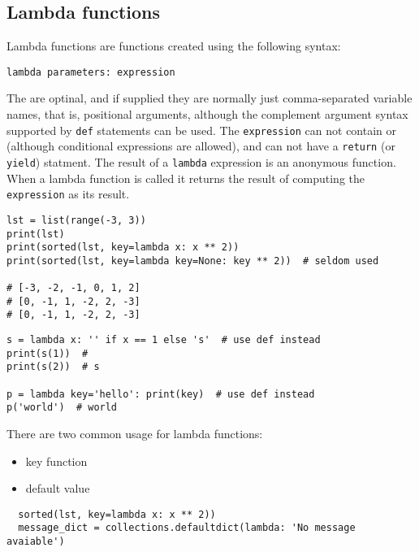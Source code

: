 \subsection{Lambda functions}

Lambda functions are functions created using the following syntax:
\begin{tcolorbox}
\begin{verbatim}
lambda parameters: expression
\end{verbatim}
\end{tcolorbox}


The  are optinal, and if supplied they are normally just comma-separated variable names, that is, positional arguments, although the complement argument syntax supported by \verb|def| statements can be used.
The \verb|expression| can not contain  or  (although conditional expressions are allowed), and can not have a \verb|return| (or \verb|yield|) statment.
The result of a \verb|lambda| expression is an anonymous function.
When a lambda function is called it returns the result of computing the \verb|expression| as its result.



\begin{lstlisting}
lst = list(range(-3, 3))
print(lst)
print(sorted(lst, key=lambda x: x ** 2))
print(sorted(lst, key=lambda key=None: key ** 2))  # seldom used

# [-3, -2, -1, 0, 1, 2]
# [0, -1, 1, -2, 2, -3]
# [0, -1, 1, -2, 2, -3]
\end{lstlisting}


\begin{lstlisting}
s = lambda x: '' if x == 1 else 's'  # use def instead
print(s(1))  #
print(s(2))  # s

p = lambda key='hello': print(key)  # use def instead
p('world')  # world  
\end{lstlisting}


There are two common usage for lambda functions:
\begin{itemize}
\item key function
\item default value
\end{itemize}

\begin{lstlisting}
  sorted(lst, key=lambda x: x ** 2))
  message_dict = collections.defaultdict(lambda: 'No message avaiable')
\end{lstlisting}





